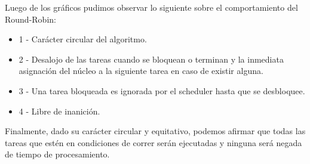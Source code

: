 \indent Luego de los gráficos pudimos observar lo siguiente sobre el comportamiento  del Round-Robin:\\
\begin{itemize}
\item 1 - Carácter circular del algoritmo.
\item 2 - Desalojo de las tareas cuando se bloquean o terminan y la inmediata asignación del núcleo a la siguiente tarea en caso de existir alguna.
\item 3 - Una tarea bloqueada es ignorada por el scheduler hasta que se desbloquee.
\item 4 - Libre de inanición.
\end{itemize}

\indent Finalmente, dado su carácter circular y equitativo, podemos afirmar que todas las tareas que 
estén en condiciones de correr serán ejecutadas y ninguna será negada de tiempo de procesamiento.\\